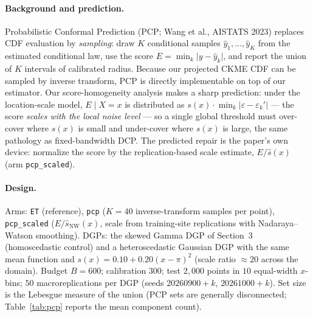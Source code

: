 \documentclass[11pt]{article}
\begin{document}
\paragraph{Background and prediction.}
Probabilistic Conformal Prediction (PCP; Wang et al., AISTATS 2023) replaces
CDF evaluation by \emph{sampling}: draw $K$ conditional samples
$\hat y_1,\dots,\hat y_K$ from the estimated conditional law, use the score
$E = \min_k \lvert y - \hat y_k\rvert$, and report the union of $K$ intervals
of calibrated radius. Because our projected CKME CDF can be sampled by
inverse transform, PCP is directly implementable on top of our estimator.
Our score-homogeneity analysis makes a sharp prediction: under the
location-scale model, $E \mid X = x$ is distributed as
$s(x)\cdot\min_k\lvert\varepsilon-\varepsilon_k'\rvert$ --- the score
\emph{scales with the local noise level} --- so a single global threshold
must over-cover where $s(x)$ is small and under-cover where $s(x)$ is large,
the same pathology as fixed-bandwidth DCP. The predicted repair is the
paper's own device: normalize the score by the replication-based scale
estimate, $E/\hat s(x)$ (arm \texttt{pcp\_scaled}).

\paragraph{Design.}
Arms: \texttt{ET} (reference), \texttt{pcp} ($K = 40$ inverse-transform
samples per point), \texttt{pcp\_scaled} ($E/\hat s_{\mathrm{NW}}(x)$, scale
from training-site replications with Nadaraya--Watson smoothing). DGPs: the
skewed Gamma DGP of Section~3 (homoscedastic control) and a heteroscedastic
Gaussian DGP with the same mean function and
$s(x) = 0.10 + 0.20(x-\pi)^2$ (scale ratio $\approx 20$ across the domain).
Budget $B = 600$; calibration $300$; test $2{,}000$ points in $10$
equal-width $x$-bins; $50$ macroreplications per DGP (seeds $20260900{+}k$,
$20261000{+}k$). Set size is the Lebesgue measure of the union (PCP sets are
generally disconnected; Table~\ref{tab:pcp} reports the mean component
count).
\end{document}

